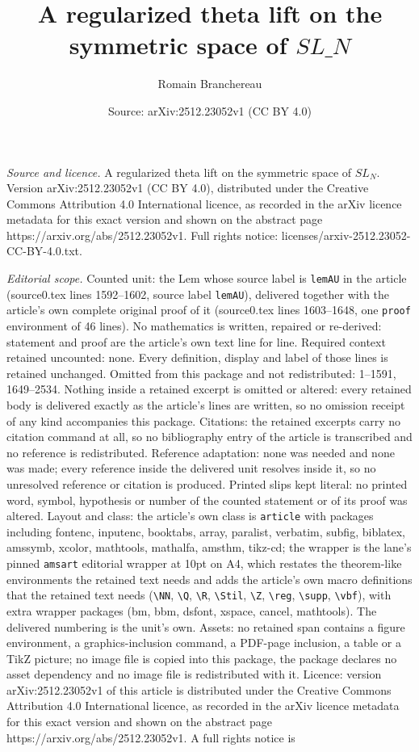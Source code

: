 \documentclass[10pt,a4paper]{amsart}
\title[A regularized theta lift on the symmetric space of $SL\_N$]{A regularized theta lift on the symmetric space of $SL\_N$}
\author{Romain Branchereau}
\date{Source: arXiv:2512.23052v1 (CC BY 4.0)}
\begin{document}
\maketitle

\noindent\emph{Source and licence.} A regularized theta lift on the symmetric space of $SL_N$. Version arXiv:2512.23052v1 (CC BY 4.0), distributed under the Creative Commons Attribution 4.0 International licence, as recorded in the arXiv licence metadata for this exact version and shown on the abstract page https://arxiv.org/abs/2512.23052v1. Full rights notice: licenses/arxiv-2512.23052-CC-BY-4.0.txt.\par\smallskip

\noindent\textit{Editorial scope.} Counted unit: the Lem whose source label is \texttt{lemAU} in the article (source0.tex lines 1592--1602, source label \texttt{lemAU}), delivered together with the article's own complete original proof of it (source0.tex lines 1603--1648, one \texttt{proof} environment of 46 lines). No mathematics is written, repaired or re-derived: statement and proof are the article's own text line for line. Required context retained uncounted: none. Every definition, display and label of those lines is retained unchanged. Omitted from this package and not redistributed: 1--1591, 1649--2534. Nothing inside a retained excerpt is omitted or altered: every retained body is delivered exactly as the article's lines are written, so no omission receipt of any kind accompanies this package. Citations: the retained excerpts carry no citation command at all, so no bibliography entry of the article is transcribed and no reference is redistributed. Reference adaptation: none was needed and none was made; every reference inside the delivered unit resolves inside it, so no unresolved reference or citation is produced. Printed slips kept literal: no printed word, symbol, hypothesis or number of the counted statement or of its proof was altered. Layout and class: the article's own class is \texttt{article} with packages including fontenc, inputenc, booktabs, array, paralist, verbatim, subfig, biblatex, amssymb, xcolor, mathtools, mathalfa, amsthm, tikz-cd; the wrapper is the lane's pinned \texttt{amsart} editorial wrapper at 10pt on A4, which restates the theorem-like environments the retained text needs and adds the article's own macro definitions that the retained text needs (\texttt{\textbackslash NN}, \texttt{\textbackslash Q}, \texttt{\textbackslash R}, \texttt{\textbackslash Stil}, \texttt{\textbackslash Z}, \texttt{\textbackslash reg}, \texttt{\textbackslash supp}, \texttt{\textbackslash vbf}), with extra wrapper packages (bm, bbm, dsfont, xspace, cancel, mathtools). The delivered numbering is the unit's own. Assets: no retained span contains a figure environment, a graphics-inclusion command, a PDF-page inclusion, a table or a TikZ picture; no image file is copied into this package, the package declares no asset dependency and no image file is redistributed with it. Licence: version arXiv:2512.23052v1 of this article is distributed under the Creative Commons Attribution 4.0 International licence, as recorded in the arXiv licence metadata for this exact version and shown on the abstract page https://arxiv.org/abs/2512.23052v1. A full rights notice is 
\end{document}
